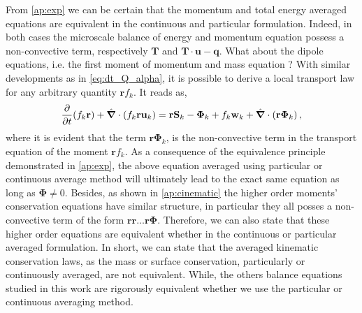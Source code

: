 From \ref{ap:exp} we can be certain that the momentum and total energy averaged equations are equivalent in the continuous and particular formulation.
Indeed, in both cases the microscale balance of energy and momentum equation possess a non-convective term, respectively $\textbf{T}$ and $\textbf{T}\cdot\textbf{u}-\textbf{q}$.
What about the dipole equations, i.e. the first moment of momentum and mass equation ?
With similar developments as in \ref{eq:dt_Q_alpha}, it is possible to derive a local transport law for any arbitrary quantity $\textbf{r}f_k$.
It reads as,
\begin{equation*}
    \frac{\partial}{\partial t} (f_k \textbf{r})
    + \hat{\bm{\nabla}} \cdot \left(
        f_k \textbf{r} \textbf{u}_k
    \right)
    = \textbf{r} \textbf{S}_k 
    - \bm{\Phi}_k
    + f_k \textbf{w}_k
    + \hat{\bm{\nabla}} \cdot \left(
        \textbf{r}\bm{\Phi}_k
    \right),
\end{equation*}
where it is evident that the term $\textbf{r} \bm{\Phi}_k$, is the non-convective term in the transport equation of the moment $\textbf{r}f_k$.
As a consequence of the equivalence principle demonstrated in \ref{ap:exp}, the above equation averaged using particular or continuous average method will ultimately lead to the exact same equation as long as $\bm{\Phi}\neq 0$. 
Besides, as shown in \ref{ap:cinematic} the higher order moments' conservation equations have similar structure, in particular they all posses a non-convective term of the form $\textbf{rr}\ldots\textbf{r}\mathbf{\Phi}$.
Therefore, we can also state that these higher order equations are equivalent whether in the continuous or particular averaged formulation.
In short, we can state that the averaged kinematic conservation laws, as the mass or surface conservation, particularly or continuously averaged, are not equivalent. 
While, the others balance equations studied in this work are rigorously equivalent whether we use the particular or continuous averaging method.   

